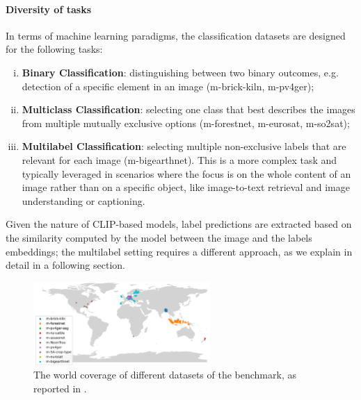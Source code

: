 \documentclass[a4paper, oneside, english]{sapthesis} %
\begin{document}
\paragraph{Diversity of tasks}

In terms of machine learning paradigms, the classification datasets are designed for the following tasks:
\begin{enumerate}[i)]
    \item \textbf{Binary Classification}: distinguishing between two binary outcomes, e.g. detection of a specific element in an image (m-brick-kiln, m-pv4ger);
    \item \textbf{Multiclass Classification}: selecting one class that best describes the images from multiple mutually exclusive options (m-forestnet, m-eurosat, m-so2sat);
    \item \textbf{Multilabel Classification}: selecting multiple non-exclusive labels that are relevant for each image (m-bigearthnet). This is a more complex task and typically leveraged in scenarios where the focus is on the whole content of an image rather than on a specific object, like image-to-text retrieval and image understanding or captioning. 
\end{enumerate}
Given the nature of CLIP-based models, label predictions are extracted based on the similarity computed by the model between the image and the labels embeddings; the multilabel setting requires a different approach, as we explain in detail in a following section.


\begin{figure}[h]
    \centering
    \includegraphics[width=0.6\textwidth]{img/geobench_world_coverage.png}
    \caption{The world coverage of different datasets of the benchmark, as reported in \cite{lacoste2023geo}.}
    \label{fig:geoworld}
\end{figure}  
\end{document}

